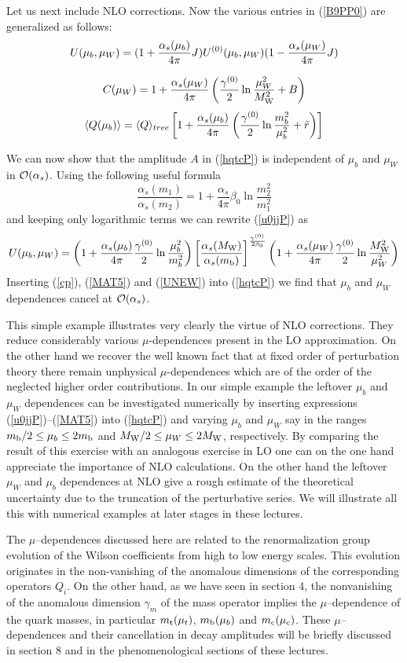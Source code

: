 \documentclass[12pt,rotate]{article}
\def\as{\alpha_s}
\newcommand{\mt}{m_{\rm t}}
\newcommand{\mc}{m_{\rm c}}
\newcommand{\mb}{m_{\rm b}}
\newcommand{\mw}{M_{\rm W}}
\newcommand{\be}{\begin{equation}}
\newcommand{\ee}{\end{equation}}
\newcommand{\ord}{{\cal O}}
\begin{document}
\begin{itemize}
\begin{itemize}
Let us next include NLO corrections. Now  the various entries in
(\ref{B9PP0}) are generalized as follows:
\begin{equation}\label{u0jjP}
 U(\mu_b,\mu_W)=
(1+{\as(\mu_b)\over 4\pi} J )  U^{(0)}(\mu_b,\mu_W) 
(1-{\as(\mu_W)\over 4\pi} J)
\end{equation}

\be\label{cp}
C(\mu_W)=1+ {\as(\mu_W)\over 4\pi}\left ( \frac{\gamma^{(0)}}{2}
\ln\frac{\mu_W^2}{\mw^2}+B\right)
\ee
\be\label{MAT5}
\langle Q(\mu_b)\rangle=\langle Q \rangle_{tree}\left[1+
{\as(\mu_b)\over 4\pi}\left( \frac{\gamma^{(0)}}{2}
\ln\frac{m_b^2}{\mu_b^2}+\tilde r\right)\right]
\ee

We can now show that the amplitude $A$ in (\ref{hqtcP})  
is independent of $\mu_b$ and $\mu_W$ 
in $\ord(\as)$.
Using the following useful formula 
\be
\frac{\as(m_1)}{\as(m_2)}=1+\frac{\as}{4\pi}\beta_0\ln\frac{m_2^2}{m_1^2}
\ee
and keeping only logarithmic terms
we can rewrite (\ref{u0jjP}) as
\be\label{UNEW}
U(\mu_b,\mu_W)=\left (1+
{\as(\mu_b)\over 4\pi} \frac{\gamma^{(0)}}{2}
\ln\frac{\mu_b^2}{m_b^2}\right)
\left[\frac{\as(\mw)}{\as(\mb)}\right]^{\frac{\gamma^{(0)}}{2\beta_0}} 
\left(1+ {\as(\mu_W)\over 4\pi} \frac{\gamma^{(0)}}{2}
\ln\frac{\mw^2}{\mu_W^2}\right)
\ee
Inserting (\ref{cp}), (\ref{MAT5}) and (\ref{UNEW}) into
(\ref{hqtcP}) we find that $\mu_b$ and $\mu_W$ dependences cancel
at $\ord(\as)$.

This simple example illustrates very clearly the virtue of NLO
corrections. They reduce considerably various $\mu$-dependences
present in the LO approximation. On the other hand we recover the
well known fact that at fixed order of perturbation theory there
remain unphysical $\mu$-dependences which are of the order of the
neglected higher order contributions. In our simple example the
leftover $\mu_b$ and $\mu_W$ dependences can be investigated
numerically by inserting expressions (\ref{u0jjP})--(\ref{MAT5}) into 
(\ref{hqtcP}) and varying $\mu_b$ and $\mu_W$ say in the ranges
$\mb/2\le \mu_b \le 2 \mb$ and $\mw/2\le \mu_W\le 2 \mw$, respectively.
By comparing the result of this exercise with an analogous exercise
in LO one can on the one hand appreciate the importance of NLO
calculations. On the other hand the leftover $\mu_W$ and $\mu_b$
dependences
at NLO give a rough estimate of the theoretical uncertainty due
to the truncation of the perturbative series. We will illustrate
all this with numerical examples at later stages in these
lectures.

The $\mu$--dependences discussed here are related to the renormalization
group evolution of the Wilson coefficients from high to low energy
scales. This evolution originates in the non-vanishing of the
anomalous dimensions of the corresponding operators $Q_i$.
On the other hand, as we have seen in section 4, the nonvanishing of 
the anomalous dimension
$\gamma_m$ of the mass operator implies the $\mu$--dependence of
the quark masses, in particular $\mt(\mu_t)$, 
$\mb(\mu_b)$ and $\mc(\mu_c)$. These $\mu$--dependences and their 
cancellation in decay amplitudes
will be briefly discussed in section 8 and in the phenomenological
sections of these lectures.


\end{itemize}
\end{itemize}
\end{document}
